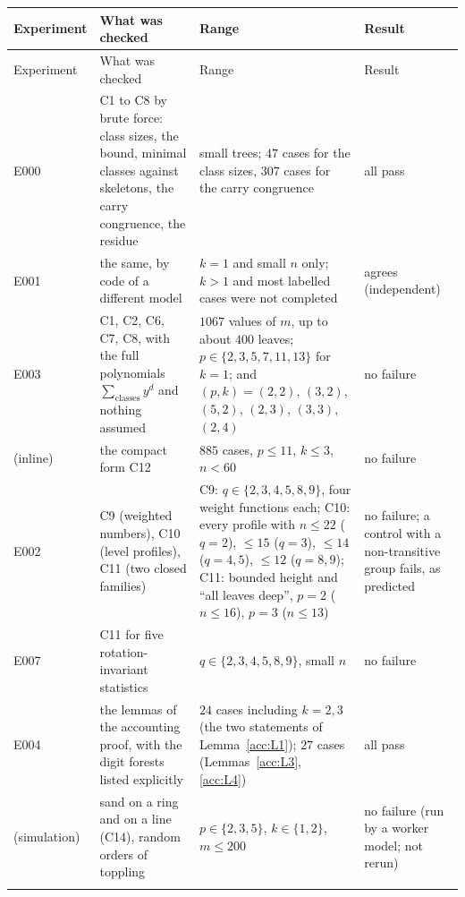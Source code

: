 \documentclass[11pt]{article}
\theoremstyle{definition}
\theoremstyle{remark}
\numberwithin{equation}{section}
\numberwithin{figure}{section}
\begin{document}
{\small
\setlength{\tabcolsep}{4pt}
\begin{longtable}{@{}>{\raggedright\arraybackslash}p{}>{\raggedright\arraybackslash}p{}>{\raggedright\arraybackslash}p{}>{\raggedright\arraybackslash}p{}@{}}
\toprule
Experiment & What was checked & Range & Result\\
\midrule
\endfirsthead
\toprule
Experiment & What was checked & Range & Result\\
\midrule
\endhead
\bottomrule
\endfoot
E000 & C1 to C8 by brute force: class sizes, the bound, minimal classes against skeletons, the carry
 congruence, the residue & small trees; $47$ cases for the class sizes, $307$ cases for the carry congruence
 & all pass\\\addlinespace[3pt]
E001 & the same, by code of a different model & $k=1$ and small $n$ only; $k>1$ and most labelled cases were
 not completed & agrees (independent)\\\addlinespace[3pt]
E003 & C1, C2, C6, C7, C8, with the full polynomials $\sum_{\text{classes}}y^d$ and nothing assumed &
 $1067$ values of $m$, up to about $400$ leaves; $p\in\{2,3,5,7,11,13\}$ for $k=1$;
 and $(p,k)=(2,2)$, $(3,2)$, $(5,2)$, $(2,3)$, $(3,3)$, $(2,4)$ & no failure\\\addlinespace[3pt]
(inline) & the compact form C12 & $885$ cases, $p\le11$, $k\le3$, $n<60$ & no failure\\\addlinespace[3pt]
E002 & C9 (weighted numbers), C10 (level profiles), C11 (two closed families) & C9: $q\in\{2,3,4,5,8,9\}$, four
 weight functions each; C10: every profile with $n\le22$ ($q=2$), $\le15$ ($q=3$), $\le14$ ($q=4,5$), $\le12$
 ($q=8,9$); C11: bounded height and ``all leaves deep'', $p=2$ ($n\le16$), $p=3$ ($n\le13$) & no failure; a
 control with a non-transitive group fails, as predicted\\\addlinespace[3pt]
E007 & C11 for five rotation-invariant statistics & $q\in\{2,3,4,5,8,9\}$, small $n$ & no failure\\\addlinespace[3pt]
E004 & the lemmas of the accounting proof, with the digit forests listed explicitly & $24$ cases including
 $k=2,3$ (the two statements of Lemma~\ref{acc:L1}); $27$ cases (Lemmas~\ref{acc:L3}, \ref{acc:L4}) & all pass\\\addlinespace[3pt]
(simulation) & sand on a ring and on a line (C14), random orders of toppling & $p\in\{2,3,5\}$,
 $k\in\{1,2\}$, $m\le200$ & no failure (run by a worker model; not rerun)\\\addlinespace[3pt]

\end{longtable}}
\end{document}
